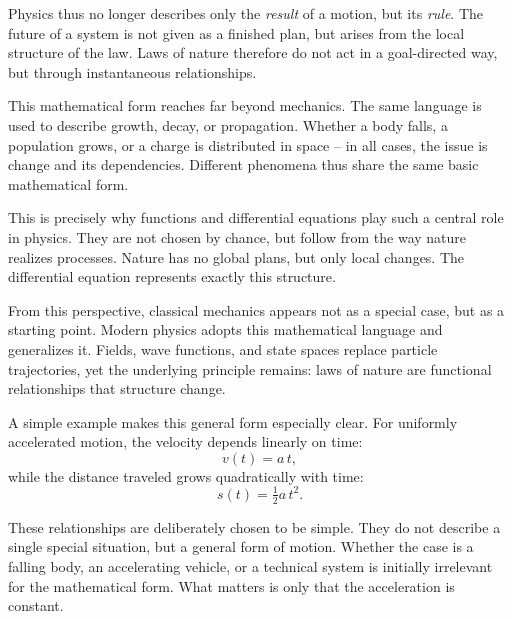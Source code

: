 Physics thus no longer describes only the \emph{result} of a motion,
but its \emph{rule}.
The future of a system is not given as a finished plan,
but arises from the local structure of the law.
Laws of nature therefore do not act in a goal-directed way,
but through instantaneous relationships.

This mathematical form reaches far beyond mechanics.
The same language is used
to describe growth,
decay,
or propagation.
Whether a body falls,
a population grows,
or a charge is distributed in space --
in all cases, the issue is change
and its dependencies.
Different phenomena thus share the same basic mathematical form.

This is precisely why functions and differential equations
play such a central role in physics.
They are not chosen by chance,
but follow from the way
nature realizes processes.
Nature has no global plans,
but only local changes.
The differential equation represents exactly this structure.

From this perspective, classical mechanics appears
not as a special case,
but as a starting point.
Modern physics
adopts this mathematical language and generalizes it.
Fields,
wave functions,
and state spaces
replace particle trajectories,
yet the underlying principle remains:
laws of nature are functional relationships
that structure change.

A simple example makes this general form especially clear.
For uniformly accelerated motion,
the velocity depends linearly on time:
\[
v(t) = a\,t,
\]
while the distance traveled grows quadratically with time:
\[
s(t) = \tfrac{1}{2} a\, t^{2}.
\]

These relationships are deliberately chosen to be simple.
They do not describe a single special situation,
but a general form of motion.
Whether the case is a falling body,
an accelerating vehicle,
or a technical system
is initially irrelevant for the mathematical form.
What matters is only
that the acceleration is constant.

